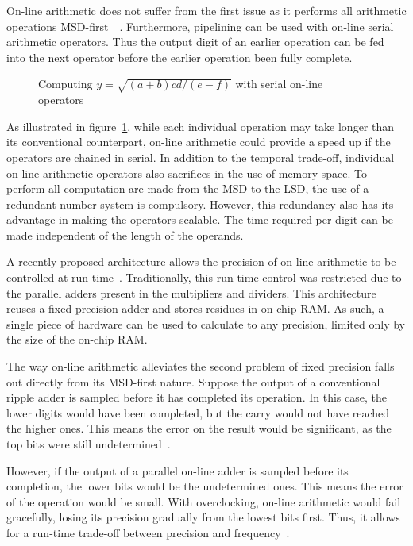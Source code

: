 On-line arithmetic does not suffer from the first issue as it performs all
arithmetic operations MSD-first~\cite{Ercegovac1}~\cite{Ercegovac2}.
Furthermore, pipelining can be used with on-line serial arithmetic operators.
Thus the output digit of an earlier operation can be fed into the next
operator before the earlier operation been fully complete.

\begin{figure}[H]
  \centering
  
  \caption{Computing $y=\sqrt{(a+b)cd/(e-f)}$ with serial on-line
           operators~\cite{Ercegovac1}}
  \label{Online}
\end{figure}

As illustrated in figure~\ref{Online}, while each individual operation may
take longer than its conventional counterpart, on-line arithmetic could provide
a speed up if the operators are chained in serial.
In addition to the temporal trade-off, individual on-line arithmetic operators
also sacrifices in the use of memory space.
To perform all computation are made from the MSD to the LSD, the use of a
redundant number system is compulsory.
However, this redundancy also has its advantage in making the operators
scalable.
The time required per digit can be made independent of the length of the
operands.~\cite{Trivedi1}

A recently proposed architecture allows the precision of
on-line arithmetic to be controlled at run-time~\cite{Zhao1}.
Traditionally, this run-time control was restricted due to the parallel adders
present in the multipliers and dividers.
This architecture reuses a fixed-precision adder and stores residues in
on-chip RAM.
As such, a single piece of hardware can be used to calculate to any precision,
limited only by the size of the on-chip RAM.

The way on-line arithmetic alleviates the second problem of fixed precision
falls out directly from its MSD-first nature.
Suppose the output of a conventional ripple adder is sampled before
it has completed its operation.
In this case, the lower digits would have been completed, but the carry would
not have reached the higher ones.
This means the error on the result would be significant, as the top bits
were still undetermined~\cite{Shi1}.

However, if the output of a parallel on-line adder is sampled before its
completion, the lower bits would be the undetermined ones.
This means the error of the operation would be small.
With overclocking, on-line arithmetic would fail gracefully, losing its
precision gradually from the lowest bits first.
Thus, it allows for a run-time trade-off between precision and
frequency~\cite{Shi2}.

